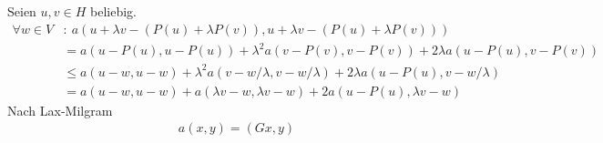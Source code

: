 \begin{solution}
\begin{itemize}
  Seien $u,v \in H$ beliebig.
  \begin{align*}
     \forall w \in V&:~a(u + \lambda v - (P(u) + \lambda P(v)),u + \lambda v - (P(u) + \lambda P(v))) \\
    &= a(u - P(u), u - P(u)) + \lambda^2a(v - P(v), v - P(v)) +
    2\lambda a(u - P(u), v - P(v))\\
    &\leq a(u - w, u - w) + \lambda^2a(v - w/\lambda, v - w/\lambda)
    + 2\lambda a(u - P(u), v - w/\lambda) \\
    &= a(u - w, u - w) + a(\lambda v - w, \lambda v - w)
    + 2 a(u - P(u),\lambda v - w)
  \end{align*}
Nach Lax-Milgram
\begin{align*}
  a(x,y) = (Gx,y)
\end{align*}
\end{itemize}

\end{solution}

